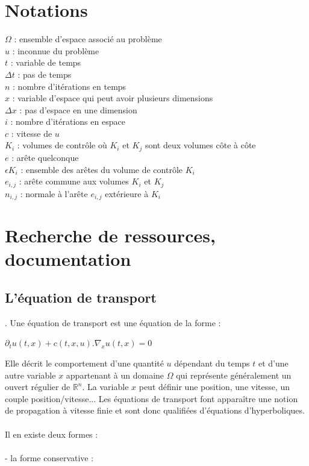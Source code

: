 \documentclass[12pt]{article}
\begin{document}
\section{Notations}

\noindent $\Omega$ : ensemble d'espace associé au problème
\\$u$ : inconnue du problème
\\$t$ : variable de temps
\\$\Delta t$ : pas de temps
\\$n$ : nombre d'itérations en temps
\\$x$ : variable d'espace qui peut avoir plusieurs dimensions
\\$\Delta x$ : pas d'espace en une dimension
\\$i$ : nombre d'itérations en espace
\\$c$ : vitesse de $u$
\\$K_i$ : volumes de contrôle où $K_i$ et $K_j$ sont deux volumes côte à côte
\\$e$ : arête quelconque
\\$\epsilon K_i$ : ensemble des arêtes du volume de contrôle $K_i$
\\$e_{i,j}$ : arête commune aux volumes $K_i$ et $K_j$
\\$n_{i,j}$ : normale à l'arête $e_{i,j}$ extérieure à $K_i$

	
\section{Recherche de ressources, documentation}
\subsection{L'équation de transport}
. Une équation de transport est une équation de la forme :

\begin{center}
    $\partial_tu(t,x)+c(t,x,u).\nabla_xu(t,x)=0 $
\end{center}

\noindent Elle décrit le comportement d'une quantité $u$ dépendant du temps $t$ et d'une autre variable $x$ appartenant à un domaine $\Omega$ qui représente généralement un ouvert régulier de $\mathbb{R}^n$. La variable $x$ peut définir une position, une vitesse, un couple position/vitesse... 
\newpage \noindent Les équations de transport font apparaître une notion de propagation à vitesse finie et sont donc qualifiées d'équations d'hyperboliques.
\\
\\Il en existe deux formes : 
\\
\\- la forme conservative :
\end{document}
